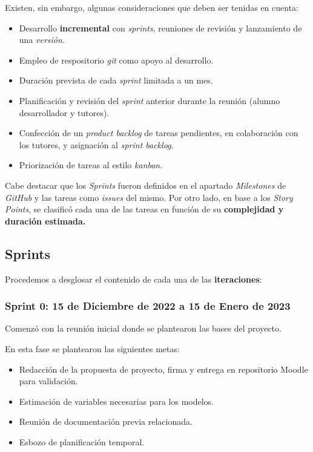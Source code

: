 Existen, sin embargo, algunas consideraciones que deben ser tenidas en cuenta:
\begin{itemize}
    \item Desarrollo \textbf{incremental} con \textit{sprints}, reuniones de revisión y lanzamiento de una \textit{versión}.
    \item Empleo de respositorio \textit{git} como apoyo al desarrollo.
    \item Duración prevista de cada \textit{sprint} limitada a un mes.
    \item Planificación y revisión del \textit{sprint} anterior durante la reunión (alumno desarrollador y tutores).
    \item Confección de un \textit{product backlog} de tareas pendientes, en colaboración con los tutores, y asignación al \textit{sprint backlog}.
    \item Priorización de tareas al estilo \textit{kanban}.
\end{itemize}

Cabe destacar que los \textit{Sprints} fueron definidos en el apartado \textit{Milestones} de \textit{GitHub} y las tareas como \textit{issues} del mismo.
Por otro lado, en base a los \textit{Story Points}, se clasificó cada una de las tareas en función de su \textbf{complejidad y duración estimada.}

\subsection{Sprints}

Procedemos a desglosar el contenido de cada una de las \textbf{iteraciones}:

\subsubsection{Sprint 0: 15 de Diciembre de 2022 a 15 de Enero de 2023}

Comenzó con la reunión inicial donde se plantearon las bases del proyecto.

En esta fase se plantearon las siguientes metas:
\begin{itemize}
    \item Redacción de la propuesta de proyecto, firma y entrega en repositorio Moodle para validación.
    \item Estimación de variables necesarias para los modelos.
    \item Reunión de documentación previa relacionada.
    \item Esbozo de planificación temporal.
\end{itemize}

